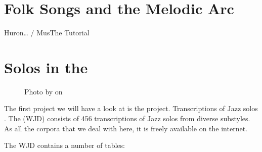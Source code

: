 \documentclass[letterpaper,10pt,english]{sphinxmanual}
\begin{document}
\chapter{Folk Songs and the Melodic Arc}
\label{\detokenize{3_folk_songs:folk-songs-and-the-melodic-arc}}\label{\detokenize{3_folk_songs::doc}}
Huron… / MusThe Tutorial


\chapter{Solos in the }
\label{\detokenize{4_jazz_solos:solos-in-the-weimar-jazz-database}}\label{\detokenize{4_jazz_solos::doc}}
\begin{figure}[htbp]
\centering
\capstart

\noindent{}
\caption{Photo by 
on }\label{\detokenize{4_jazz_solos:id3}}\end{figure}

The first project we will have a look at is the  project.
Transcriptions of Jazz solos . The  (WJD) consists of
456 transcriptions of Jazz solos from diverse substyles.
As all the corpora that we deal with here, it is freely available on the internet. %
\begin{footnote}[1]\sphinxAtStartFootnote
{}
%
\end{footnote}

The WJD contains a number of tables:
\end{document}
